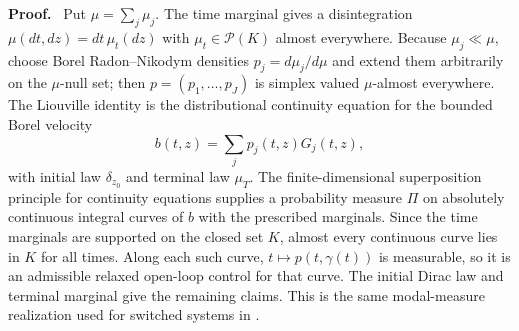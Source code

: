 \documentclass[twoside,11pt]{article}
\renewenvironment{proof}[1][Proof]{\par\noindent\textbf{#1.}\ }{\hfill\BlackBox\par\medskip}
\begin{document}
\begin{proof}
Put $\mu=\sum_j\mu_j$.  The time marginal gives a disintegration
$\mu(dt,dz)=dt\,\mu_t(dz)$ with $\mu_t\in\mathcal P(K)$ almost everywhere.
Because $\mu_j\ll\mu$, choose Borel Radon--Nikodym densities
$p_j=d\mu_j/d\mu$ and extend them arbitrarily on the $\mu$-null set; then
$p=(p_1,\ldots,p_J)$ is simplex valued $\mu$-almost everywhere.  The
Liouville identity is the distributional continuity equation for the bounded
Borel velocity
\[
 b(t,z)=\sum_jp_j(t,z)G_j(t,z),
\]
with initial law $\delta_{z_0}$ and terminal law $\mu_T$.  The finite-dimensional
superposition principle for continuity equations
\citep[Theorem~8.2.1]{AmbrosioGigliSavare2008} supplies a probability measure
$\Pi$ on absolutely continuous integral curves of $b$ with the prescribed
marginals.  Since the time marginals are supported on the closed set $K$,
almost every continuous curve lies in $K$ for all times.  Along each such
curve, $t\mapsto p(t,\gamma(t))$ is measurable, so it is an admissible relaxed
open-loop control for that curve.  The initial Dirac law and terminal marginal
give the remaining claims.  This is the same modal-measure realization used
for switched systems in \citet[Theorems~1--2]{ClaeysDaafouzHenrion2016}.
\end{proof}
\end{document}
